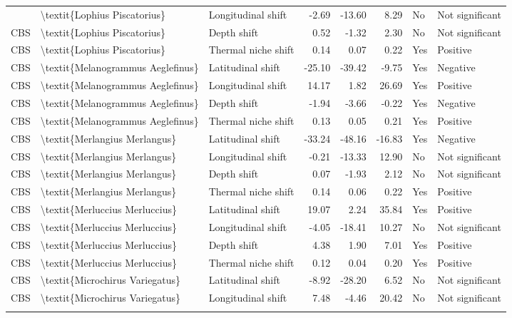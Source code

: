 \begin{longtable}[t]{lllrrrll}
{{CBS & \textbackslash{}textit\{Lophius Piscatorius\} & Longitudinal shift & -2.69 & -13.60 & 8.29 & No & Not significant\\
\addlinespace
CBS & \textbackslash{}textit\{Lophius Piscatorius\} & Depth shift & 0.52 & -1.32 & 2.30 & No & Not significant\\
CBS & \textbackslash{}textit\{Lophius Piscatorius\} & Thermal niche shift & 0.14 & 0.07 & 0.22 & Yes & Positive\\
CBS & \textbackslash{}textit\{Melanogrammus Aeglefinus\} & Latitudinal shift & -25.10 & -39.42 & -9.75 & Yes & Negative\\
CBS & \textbackslash{}textit\{Melanogrammus Aeglefinus\} & Longitudinal shift & 14.17 & 1.82 & 26.69 & Yes & Positive\\
CBS & \textbackslash{}textit\{Melanogrammus Aeglefinus\} & Depth shift & -1.94 & -3.66 & -0.22 & Yes & Negative\\
\addlinespace
CBS & \textbackslash{}textit\{Melanogrammus Aeglefinus\} & Thermal niche shift & 0.13 & 0.05 & 0.21 & Yes & Positive\\
CBS & \textbackslash{}textit\{Merlangius Merlangus\} & Latitudinal shift & -33.24 & -48.16 & -16.83 & Yes & Negative\\
CBS & \textbackslash{}textit\{Merlangius Merlangus\} & Longitudinal shift & -0.21 & -13.33 & 12.90 & No & Not significant\\
CBS & \textbackslash{}textit\{Merlangius Merlangus\} & Depth shift & 0.07 & -1.93 & 2.12 & No & Not significant\\
CBS & \textbackslash{}textit\{Merlangius Merlangus\} & Thermal niche shift & 0.14 & 0.06 & 0.22 & Yes & Positive\\
\addlinespace
CBS & \textbackslash{}textit\{Merluccius Merluccius\} & Latitudinal shift & 19.07 & 2.24 & 35.84 & Yes & Positive\\
CBS & \textbackslash{}textit\{Merluccius Merluccius\} & Longitudinal shift & -4.05 & -18.41 & 10.27 & No & Not significant\\
CBS & \textbackslash{}textit\{Merluccius Merluccius\} & Depth shift & 4.38 & 1.90 & 7.01 & Yes & Positive\\
CBS & \textbackslash{}textit\{Merluccius Merluccius\} & Thermal niche shift & 0.12 & 0.04 & 0.20 & Yes & Positive\\
CBS & \textbackslash{}textit\{Microchirus Variegatus\} & Latitudinal shift & -8.92 & -28.20 & 6.52 & No & Not significant\\
\addlinespace
CBS & \textbackslash{}textit\{Microchirus Variegatus\} & Longitudinal shift & 7.48 & -4.46 & 20.42 & No & Not significant\\
}}
\end{longtable}
